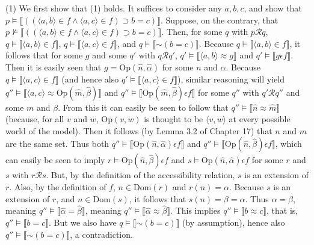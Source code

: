 \documentclass{article}
\newcommand*{\oldneg}{\mathord{\sim}}
\newcommand{\lbc}{\llbracket}
\newcommand{\rbc}{\rrbracket}
\theoremstyle{definition}
\begin{document}
(1) We first show that (1) holds. It suffices to consider any $a,b,c$, and show that
$p\vDash\lbc((\langle a,b\rangle\in f\wedge\langle a,c\rangle\in f)\supset b=c)\rbc$. Suppose, on the contrary, that 
$p\nvDash\lbc((\langle a,b\rangle\in f\wedge\langle a,c\rangle\in f)\supset b=c)\rbc$. Then, for some $q$ with 
$p\mathcal{R}q$, $q\vDash\lbc\langle a,b\rangle\in f\rbc$, $q\vDash\lbc\langle a,c\rangle\in f\rbc$, 
and $q\vDash\lbc\oldneg (b=c)\rbc$. Because $q\vDash\lbc\langle a,b\rangle\in f\rbc$, it follows that for some 
$g$ and some $q'$ with $q\mathcal{R}q'$, $q'\vDash\lbc\langle a,b\rangle\approx g\rbc$ and 
$q'\vDash\lbc g\epsilon f\rbc$. Then it is easily seen that $g=\textrm{Op}(\hat{n},\hat{\alpha})$ for 
some $n$ and $\alpha$. Because $q\vDash\lbc\langle a,c\rangle\in f\rbc$ (and hence also $q'\vDash\lbc\langle a,c\rangle\in f\rbc$), 
similar reasoning will yield $q''\vDash\lbc\langle a,c\rangle\approx\textrm{Op}(\hat{m},\hat{\beta})\rbc$ and 
$q''\vDash\lbc\textrm{Op}(\hat{m},\hat{\beta})\epsilon f\rbc$ for some $q''$ with $q'\mathcal{R}q''$ and some 
$m$ and $\beta$. From this it can easily be seen to follow that $q''\vDash\lbc\hat{n}\approx\hat{m}\rbc$ (because, for all 
$v$ and $w$, $\textrm{Op}(v,w)$ is thought to be $\langle v,w\rangle$ at every possible world of the model).
Then it follows (by Lemma 3.2 of Chapter 17) that $n$ and $m$ are the same set. 
Thus both $q''\vDash\lbc\textrm{Op}(\hat{n},\hat{\alpha})\epsilon f\rbc$ and 
$q''\vDash\lbc\textrm{Op}(\hat{n},\hat{\beta})\epsilon f\rbc$, which can easily be seen to imply 
$r\vDash\textrm{Op}(\hat{n},\hat{\beta})\epsilon f$ and $s\vDash\textrm{Op}(\hat{n},\hat{\alpha})\epsilon f$ 
for some $r$ and $s$ with $r\mathcal{R}s$. But, by the definition of the accessibility relation, 
$s$ is an extension of $r$. Also, by the definition of $f$, $n\in\textrm{Dom}(r)$ and 
$r(n)=\alpha$. Because $s$ is an extension of $r$, and $n\in\textrm{Dom}(s)$, it follows that 
$s(n)=\beta=\alpha$. Thus $\alpha=\beta$, meaning $q''\vDash\lbc\hat{\alpha}=\hat{\beta}\rbc$, meaning 
$q''\vDash\lbc\hat{\alpha}\approx\hat{\beta}\rbc$. This implies $q''\vDash\lbc b\approx c\rbc$, that is, 
$q''\vDash\lbc b=c\rbc$. But we also have 
$q\vDash\lbc\oldneg (b=c)\rbc$ (by assumption), hence also $q''\vDash\lbc\oldneg (b=c)\rbc$, a contradiction.
\end{document}
